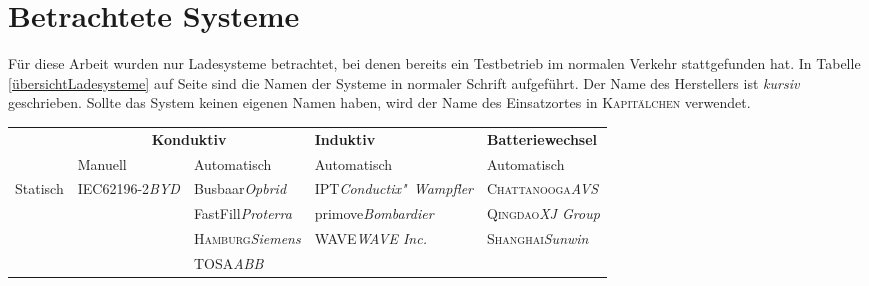 \documentclass{scrreprt}
\begin{document}
\section{Betrachtete Systeme}
Für diese Arbeit wurden nur Ladesysteme betrachtet, bei denen bereits ein Testbetrieb im normalen Verkehr stattgefunden hat. In Tabelle \ref{übersichtLadesysteme} auf Seite \pageref{übersichtLadesysteme} sind die Namen der Systeme in normaler Schrift aufgeführt. Der Name des Herstellers ist \emph{kursiv} geschrieben. Sollte das System keinen eigenen Namen haben, wird der Name des Einsatzortes in \textsc{Kapitälchen} verwendet.
\begin{table}[htbp]\centering
	\begin{tabularx}{\linewidth}{lp{2.1cm}p{2.1cm}XX}
		\toprule
		                           &                       \multicolumn{2}{c}{\textbf{Konduktiv}}                       & \textbf{Induktiv}                     & \textbf{Batteriewechsel}                \\
		\cmidrule{2-3}             & Manuell                                   & Automatisch                            & Automatisch                           & Automatisch                             \\ \midrule
		\multirow{12}{*}{Statisch} & IEC62196-2\newline\emph{BYD}              & Busbaar\newline\emph{Opbrid}           & IPT\newline\emph{Conductix"~Wampfler} & \textsc{Chattanooga}\newline\emph{AVS}  \\
		                           &                                           & FastFill\newline\emph{Proterra}        & primove\newline\emph{Bombardier}      & \textsc{Qingdao}\newline\emph{XJ Group} \\
		                           &                                           & \textsc{Hamburg}\newline\emph{Siemens} & WAVE\newline\emph{WAVE Inc.}          & \textsc{Shanghai}\newline\emph{Sunwin}  \\
		                           &                                           & TOSA\newline\emph{ABB}                 &                                       &  \\

\end{tabularx}
\end{table}
\end{document}
